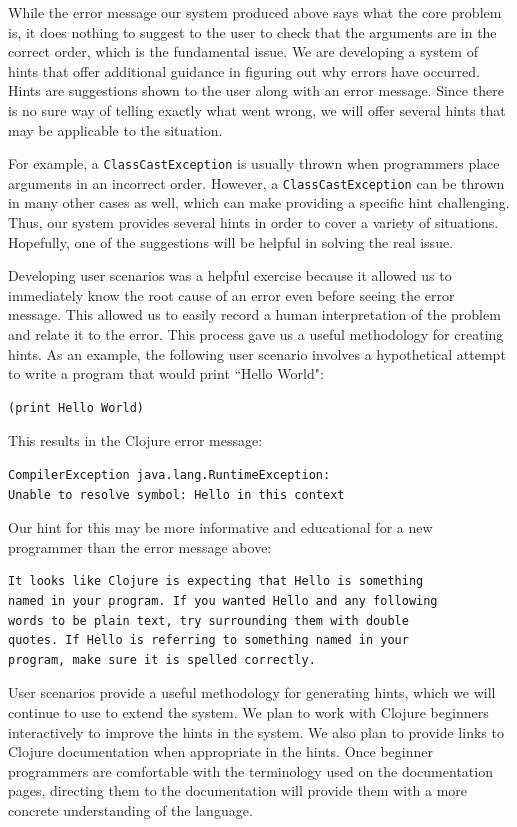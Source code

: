 \documentclass[12pt]{article}
\begin{document}
While the error message our system produced above says what the core problem is, it does nothing to suggest to the user to check 
that the arguments are in the correct order, which is the fundamental issue.
We are developing a system of hints that offer additional guidance in figuring out why errors have occurred.
Hints are suggestions shown to the user along with an error message.
Since there is no sure way of telling exactly what went wrong, we will offer several hints that may be applicable to the 
situation.

For example, a \texttt{ClassCastException} is usually thrown when programmers place arguments in an incorrect order.
However, a \texttt{ClassCastException} can be thrown in many other cases as well, which can make providing a specific hint challenging.
Thus, our system provides several hints in order to cover a variety of situations.
Hopefully, one of the suggestions will be helpful in solving the real issue.

Developing user scenarios was a helpful exercise because it allowed us to immediately know the root cause of an error even before 
seeing the error message.
This allowed us to easily record a human interpretation of the problem and relate it to the error. This process gave us a useful 
methodology for creating hints. As an example, the following user scenario involves a hypothetical attempt to write a program that 
would print ``Hello World":

\begin{verbatim}
(print Hello World)
\end{verbatim}

This results in the Clojure error message:
\begin{verbatim}
CompilerException java.lang.RuntimeException:
Unable to resolve symbol: Hello in this context
\end{verbatim}

Our hint for this may be more informative and educational for a new programmer than the error message above:

\begin{verbatim}
It looks like Clojure is expecting that Hello is something
named in your program. If you wanted Hello and any following
words to be plain text, try surrounding them with double
quotes. If Hello is referring to something named in your
program, make sure it is spelled correctly.
\end{verbatim}

User scenarios provide a useful methodology for generating hints, which we will continue to use to extend the system.
We plan to work with Clojure beginners interactively to improve the hints in the system.
We also plan to provide links to Clojure documentation when appropriate in the hints.
Once beginner programmers are comfortable with the terminology used on the documentation pages, directing them to the documentation will provide them with a more concrete understanding of the language.
\end{document}
